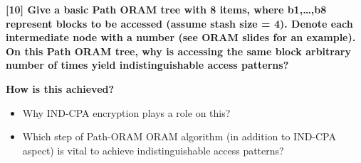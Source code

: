 \documentclass[letterpaper,11pt,notitlepage,fleqn]{article}
\begin{document}
 
\noindent \textbf{[10] Give a basic Path ORAM tree with 8 items, where b1,…,b8 represent blocks to be accessed (assume stash size = 4). Denote each intermediate node with a number (see ORAM slides for an example). On this Path ORAM tree, why is accessing the same block arbitrary number of times yield indistinguishable access patterns?} 

\noindent \textbf{How is this achieved?}
\begin{itemize}
    \item Why IND-CPA encryption plays a role on this?
    \item Which  step  of  Path-ORAM  ORAM  algorithm  (in  addition  to  IND-CPA aspect) is vital to achieve indistinguishable access patterns?
\end{itemize}

\medskip


\end{document}
